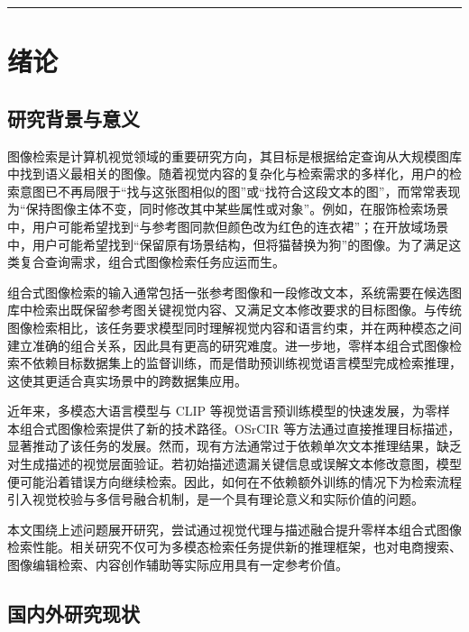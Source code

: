 \documentclass[12pt,a4paper,UTF8,oneside,openany]{ctexrep}
\begin{document}
\begin{center}\rule{0.5\linewidth}{0.5pt}\end{center}

\hypertarget{ux7eeaux8bba}{%
\section{绪论}\label{ux7eeaux8bba}}

\hypertarget{ux7814ux7a76ux80ccux666fux4e0eux610fux4e49}{%
\subsection{研究背景与意义}\label{ux7814ux7a76ux80ccux666fux4e0eux610fux4e49}}

图像检索是计算机视觉领域的重要研究方向，其目标是根据给定查询从大规模图库中找到语义最相关的图像。随着视觉内容的复杂化与检索需求的多样化，用户的检索意图已不再局限于``找与这张图相似的图''或``找符合这段文本的图''，而常常表现为``保持图像主体不变，同时修改其中某些属性或对象''。例如，在服饰检索场景中，用户可能希望找到``与参考图同款但颜色改为红色的连衣裙''；在开放域场景中，用户可能希望找到``保留原有场景结构，但将猫替换为狗''的图像。为了满足这类复合查询需求，组合式图像检索任务应运而生。

组合式图像检索的输入通常包括一张参考图像和一段修改文本，系统需要在候选图库中检索出既保留参考图关键视觉内容、又满足文本修改要求的目标图像。与传统图像检索相比，该任务要求模型同时理解视觉内容和语言约束，并在两种模态之间建立准确的组合关系，因此具有更高的研究难度。进一步地，零样本组合式图像检索不依赖目标数据集上的监督训练，而是借助预训练视觉语言模型完成检索推理，这使其更适合真实场景中的跨数据集应用。

近年来，多模态大语言模型与 CLIP
等视觉语言预训练模型的快速发展，为零样本组合式图像检索提供了新的技术路径。OSrCIR
等方法通过直接推理目标描述，显著推动了该任务的发展。然而，现有方法通常过于依赖单次文本推理结果，缺乏对生成描述的视觉层面验证。若初始描述遗漏关键信息或误解文本修改意图，模型便可能沿着错误方向继续检索。因此，如何在不依赖额外训练的情况下为检索流程引入视觉校验与多信号融合机制，是一个具有理论意义和实际价值的问题。

本文围绕上述问题展开研究，尝试通过视觉代理与描述融合提升零样本组合式图像检索性能。相关研究不仅可为多模态检索任务提供新的推理框架，也对电商搜索、图像编辑检索、内容创作辅助等实际应用具有一定参考价值。

\hypertarget{ux56fdux5185ux5916ux7814ux7a76ux73b0ux72b6}{%
\subsection{国内外研究现状}\label{ux56fdux5185ux5916ux7814ux7a76ux73b0ux72b6}}
\end{document}
